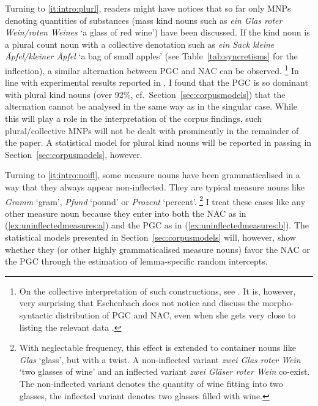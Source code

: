 \documentclass[USenglish]{article}
\begin{document}
Turning to \ref{it:intro:plurl}, readers might have notices that so far only MNPs denoting quantities of substances (mass kind nouns such as \textit{ein Glas roter Wein\slash roten Weines} `a glass of red wine') have been discussed.
If the kind noun is a plural count noun with a collective denotation such as \textit{ein Sack kleine Äpfel\slash kleiner Äpfel} `a bag of small apples' (see Table~\ref{tab:syncretisms} for the inflection), a similar alternation between PGC and NAC can be observed.%
\footnote{\label{fn:eschenbash}On the collective interpretation of such constructions, see \cite{Eschenbach1994}.
It is, however, very surprising that Eschenbach does not notice and discuss the morpho-syntactic distribution of PGC and NAC, even when she gets very close to listing the relevant data \citep[217]{Eschenbach1994}.}
In line with experimental results reported in \cite[15--16]{Zimmer2015}, I found that the PGC is so dominant with plural kind nouns (over 92\%, cf.\ Section~\ref{sec:corpusmodels}) that the alternation cannot be analysed in the same way as in the singular case.
While this will play a role in the interpretation of the corpus findings, such plural\slash collective MNPs will not be dealt with prominently in the remainder of the paper.
A statistical model for plural kind nouns will be reported in passing in Section~\ref{sec:corpusmodels}, however.

Turning to \ref{it:intro:noifl}, some measure nouns have been grammaticalised in a way that they always appear non-inflected.
They are typical measure nouns like \textit{Gramm} `gram', \textit{Pfund} `pound' or \textit{Prozent} `percent'.%
\footnote{With neglectable frequency, this effect is extended to container nouns like \textit{Glas} `glass', but with a twist.
A non-inflected variant \textit{zwei Glas roter Wein} `two glasses of wine' and an inflected variant \textit{zwei Gläser roter Wein} co-exist.
The non-inflected variant denotes the quantity of wine fitting into two glasses, the inflected variant denotes two glasses filled with wine.}
I treat these cases like any other measure noun because they enter into both the NAC as in (\ref{ex:uninflectedmeasures:a}) and the PGC as in (\ref{ex:uninflectedmeasures:b}).
The statistical models presented in Section~\ref{sec:corpusmodels} will, however, show whether they (or other highly grammaticalised measure nouns) favor the NAC or the PGC through the estimation of lemma-specific random intercepts.

\begin{exe}
  \ex\label{ex:uninflectedmeasures}
  \begin{xlist}
  \end{xlist}
\end{exe}
\end{document}
